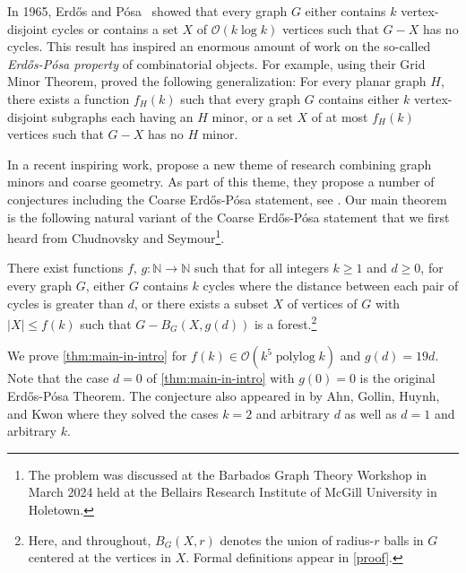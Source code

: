 \documentclass{patmorin}
\DeclareMathOperator{\polylog}{polylog}
\newcommand{\Oh}{\mathcal{O}}
\begin{document}
In 1965, Erdős and Pósa~\cite{EP1965} showed that every graph $G$ 
either contains $k$ vertex-disjoint cycles 
or contains a set $X$ of $\Oh(k\log k)$ vertices such that $G-X$ has no cycles. 
This result has inspired an enormous amount of work on the so-called \emph{Erdős-Pósa property} of combinatorial objects. 
For example, using their Grid Minor Theorem, \citet{RS1986} proved the following generalization: For every planar graph $H$, there exists a function $f_H(k)$ such that every graph $G$ contains either $k$ vertex-disjoint subgraphs each having an $H$ minor, or a set $X$ of at most $f_H(k)$ vertices such that $G-X$ has no $H$ minor. 

In a recent inspiring work, \citet{GP23} propose a new theme of research combining graph minors and coarse geometry. 
As part of this theme, they propose a number of conjectures including the Coarse Erdős-Pósa statement, see \cite[Conjecture 9.7]{GP23}. Our main theorem is the following natural variant of the Coarse Erdős-Pósa statement that we first heard from Chudnovsky and Seymour\footnote{The problem was discussed at the Barbados Graph Theory Workshop in March 2024 held at the Bellairs Research Institute of McGill University in Holetown.}.

\begin{thm}\label{thm:main-in-intro}
  There exist functions $f,\, g:\mathbb{N}\to\mathbb{N}$ such that for all integers $k\ge 1$ and $d\ge 0$, for every graph $G$,  either $G$ contains $k$ cycles where the distance between each pair of cycles is greater than $d$, or  there exists a subset $X$ of vertices of $G$ with $|X|\leq f(k)$ such that  $G-B_G(X,g(d))$ is a forest.\footnote{Here, and throughout, $B_G(X,r)$ denotes the union of radius-$r$ balls in $G$ centered at the vertices in $X$.  Formal definitions appear in \cref{proof}.}
\end{thm}
We prove \cref{thm:main-in-intro} for $f(k)\in\Oh(k^5\polylog k)$ and $g(d)=19d$. 
Note that the case $d=0$ of \cref{thm:main-in-intro} with $g(0)=0$ is the original Erd\H{o}s-Pósa Theorem. 
The conjecture also appeared in \cite{ahn.gollin:coarse} by Ahn, Gollin, Huynh, and
Kwon where they 
solved the cases $k=2$ and arbitrary $d$ as well as $d=1$ and arbitrary $k$.  
\end{document}
